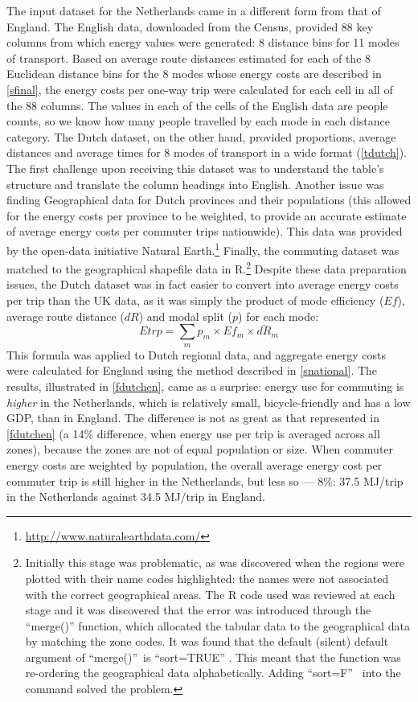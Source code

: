 The input dataset for the Netherlands came in a different form from
that of England. The English data, downloaded from the Census,
provided 88 key columns from which energy values were generated:
8 distance bins for 11 modes of transport. Based on average route distances
estimated for each of the 8 Euclidean distance bins for the 8 modes whose
energy costs are described in \cref{sfinal}, the energy costs per one-way
trip were calculated for each cell in all of the 88 columns. The values in
each of the cells of the English data are people counts, so we know how many
people travelled by each mode in each distance category.
The Dutch dataset, on the other hand, provided proportions, average distances
and average times for 8 modes of transport in a wide format (\cref{tdutch}).
The first challenge upon receiving this dataset was to understand the
table's structure and translate the column headings into English.
Another issue was finding Geographical data for Dutch provinces and their
populations (this allowed for the energy costs per province to be weighted,
to provide an accurate estimate of average energy costs per commuter trips
nationwide). This data was provided by the open-data initiative
Natural Earth.\footnote{\href{http://www.naturalearthdata.com/}
{http://www.naturalearthdata.com/}
}
Finally, the commuting dataset was matched to the geographical shapefile
data in %
R.\footnote{Initially
this stage was problematic, as was discovered when the regions were
plotted with their name codes highlighted: the names were not associated
with the correct geographical areas. The R code used was reviewed at
each stage and it was discovered that the error was introduced through
the ``merge()'' function, which allocated the tabular data to the
geographical data by matching the zone codes. It was found that the
default (silent) default argument of ``merge()''~is ``sort=TRUE'' .
This meant that the function was re-ordering the geographical data
alphabetically. Adding ``sort=F'' ~into the command solved the problem.
}
Despite these data preparation issues, the Dutch dataset
was in fact easier to convert into average energy costs per trip than
the UK data, as it was simply the product of mode efficiency ($Ef$), average
route distance ($dR$) and modal split ($p$) for each mode:
\begin{equation}
 Etrp = \sum_m p_m \times Ef_m \times \bar{dR}_m
\end{equation}
This formula was applied to Dutch regional data, and aggregate energy costs
were calculated for England using the method described in \cref{snational}.
The results, illustrated in \cref{fdutchen}, came as a surprise:
energy use for commuting is \emph{higher} in the Netherlands, which is relatively
small, bicycle-friendly and has a low GDP, than in England. The difference
is not as great as that represented in \cref{fdutchen} (a 14\% difference,
when energy use per trip is averaged across all zones), because the zones
are not of equal population or size. When commuter energy costs are
weighted by population, the overall average energy cost per commuter trip
is still higher in the Netherlands, but less so --- 8\%:
37.5 MJ/trip in the Netherlands against 34.5 MJ/trip in England.

